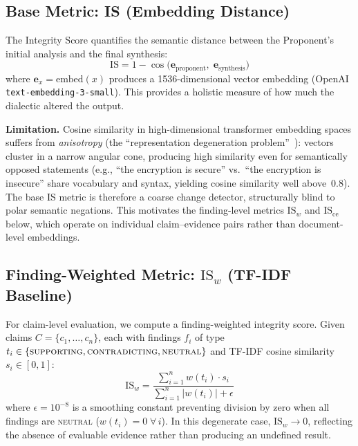 \documentclass[11pt,a4paper]{article}
\begin{document}
\subsection{Base Metric: IS (Embedding Distance)}

The Integrity Score quantifies the semantic distance between the
Proponent's initial analysis and the final synthesis:
\begin{equation}\label{eq:is-base}
  \mathrm{IS} = 1 - \cos\!\bigl(\mathbf{e}_{\mathrm{proponent}},\;
                                  \mathbf{e}_{\mathrm{synthesis}}\bigr)
\end{equation}
where $\mathbf{e}_x = \mathrm{embed}(x)$ produces a
1536-dimensional vector embedding (OpenAI \texttt{text-embedding-3-small}).
This provides a holistic measure of how much the dialectic altered
the output.

\textbf{Limitation.}  Cosine similarity in high-dimensional
transformer embedding spaces suffers from \emph{anisotropy} (the
``representation degeneration problem''~\cite{ethayarajh2019contextual}):
vectors cluster in a narrow angular cone, producing high similarity
even for semantically opposed statements (e.g., ``the encryption is
secure'' vs.\ ``the encryption is insecure'' share vocabulary and
syntax, yielding cosine similarity well above~0.8).  The base IS
metric is therefore a coarse change detector, structurally blind to
polar semantic negations.  This motivates the finding-level metrics
$\mathrm{IS}_w$ and $\mathrm{IS_{ce}}$ below, which operate on
individual claim--evidence pairs rather than document-level embeddings.

\subsection{Finding-Weighted Metric: \texorpdfstring{$\mathrm{IS}_w$}{IS\_w}
  (TF-IDF Baseline)}\label{sec:is-w}

For claim-level evaluation, we compute a finding-weighted integrity
score.  Given claims $C = \{c_1,\ldots,c_n\}$, each with findings
$f_i$ of type $t_i \in \{\textsc{supporting}, \textsc{contradicting},
\textsc{neutral}\}$ and TF-IDF cosine similarity $s_i \in [0,1]$:
\begin{equation}\label{eq:is-w}
  \mathrm{IS}_w
  = \frac{\displaystyle\sum_{i=1}^{n} w(t_i)\cdot s_i}
         {\displaystyle\sum_{i=1}^{n} |w(t_i)| + \epsilon}
\end{equation}
where $\epsilon = 10^{-8}$ is a smoothing constant preventing
division by zero when all findings are \textsc{neutral}
($w(t_i)=0\;\forall\,i$).  In this degenerate case,
$\mathrm{IS}_w \to 0$, reflecting the absence of evaluable evidence
rather than producing an undefined result.
\end{document}
